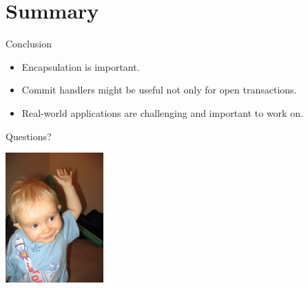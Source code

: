 \documentclass[]{beamer}
\begin{document}
\section{Summary}

\begin{frame}{Conclusion}
\begin{itemize}
\item Encapsulation is important.
\item Commit handlers might be useful not only for open transactions.
\item Real-world applications are challenging and important to work on.
\end{itemize}
\end{frame}

\begin{frame}{Questions?}
\begin{center}
\includegraphics[height=5cm]{raisehand.jpg}
\end{center}
\end{frame}
\end{document}
